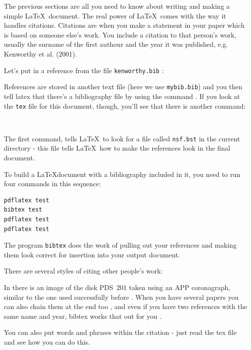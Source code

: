 \documentclass[a4,modern]{aastex63}
\begin{document}
The previous sections are all you need to know about writing and making a simple \LaTeX\ document.
%
The real power of \LaTeX\ comes with the way it handles citations.
%
Citations are when you make a statement in your paper which is based on someone
else's work.
%
You include a citation to that person's work, usually the surname of the first authour and the year it was published, e.g. Kenworthy et al. (2001).

Let's put in a reference from the file \verb=kenworthy.bib= : \citet{Quanz10b}

References are stored in another text file (here we use \verb=mybib.bib=) and
you then tell latex that there's a bibliography file by using the command
\verb==.
%
If you look at the \verb=tex= file for this document, though, you'll see that there is another command:

\begin{verbatim}


\end{verbatim}

The first command, \verb== tells \LaTeX\ to look for a file called \verb=nsf.bst= in the current directory - this file tells \LaTeX\ how to make the references look in the final document.

To build a \LaTeX document with a bibliography included in it, you need to run four commands in this sequence:

\begin{verbatim}
pdflatex test
bibtex test
pdflatex test
pdflatex test
\end{verbatim}

The program \verb=bibtex= does the work of pulling out your references and making them look correct for insertion into your output document.

There are several styles of citing other people's work:

In \citet{Wagner20} there is an image of the disk PDS~201 taken using an APP coronagraph, similar to the one used successfully before \citep{Quanz10}.
%
When you have several papers \citep{Quanz10b,Kenworthy20} you can also chain them at the end too \citet{2019ApJS..244...15M,Quanz10}, and even if you have two references with the same name and year, bibtex works that out for you \citep{Quanz10,Quanz10b}.

You can also put words and phrases within the citation \citep[e.g.][ as an example]{Kenworthy20} - just read the tex file and see how you can do this.
\end{document}

